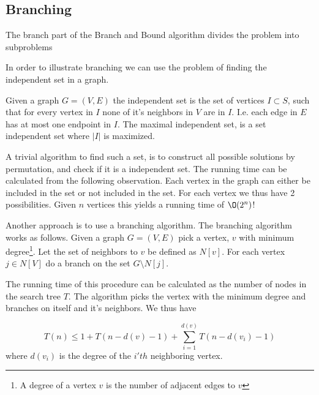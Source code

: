\documentclass[10pt]{article}
\begin{document}
\subsection{Branching} %
\label{sub:branching}
The branch part of the Branch and Bound algorithm divides the problem into subproblems

In order to illustrate branching we can use the problem of finding the independent set in a graph. 

Given a graph $G = (V,E)$ the independent set is the set of vertices $I \subset S$, such that for every vertex in $I$ none of it's neighbors in $V$ are in $I$. I.e. each edge in $E$ has at most one endpoint in $I$. The maximal independent set, is a set independent set where $|I|$ is maximized.

A trivial algorithm to find such a set, is to construct all possible solutions by permutation, and check if it is a independent set. The running time can be calculated from the following observation. Each vertex in the graph can either be included in the set or not included in the set. For each vertex we thus have 2 possibilities. Given $n$ vertices this yields a running time of $\O(2^n)$!

Another approach is to use a branching algorithm. The branching algorithm works as follows. Given a graph $G = (V,E)$ pick a vertex, $v$ with minimum degree\footnote{A degree of a vertex $v$ is the number of adjacent edges to $v$}. Let the set of neighbors to $v$ be defined as $N[v]$. For each vertex $j \in N[V]$ do a branch on the set $G \setminus N[j]$.

The running time of this procedure can be calculated as the number of nodes in the search tree $T$. The algorithm picks the vertex with the minimum degree and branches on itself and it's neighbors. We thus have

\begin{equation}
  T(n) \leq 1 + T(n-d(v)-1) + \sum_{i=1}^{d(v)} T(n-d(v_i)-1)
\end{equation}
where $d(v_i)$ is the degree of the $i'th$ neighboring vertex. 
\end{document}

